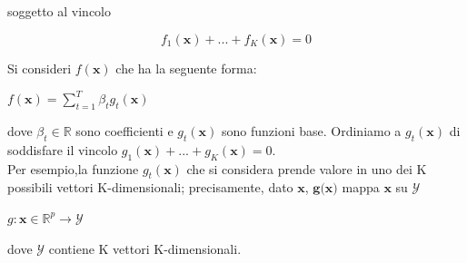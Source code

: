  soggetto al vincolo
\begin{center} 
\begin{equation}\label{eq:vincolo}
f_1(\textbf{x}) + ... + f_K(\textbf{x}) = 0
\end{equation}
\end{center}
Si consideri \begin{math}
              f(\textbf{x})
             \end{math} che ha la seguente forma:
\begin{center}
 \begin{math} f(\textbf{x}) = \sum_{t=1}^T\beta_t g_t(\textbf{x})
\end{math}
\end{center}
dove \begin{math}
      \beta_t \in \mathbb{R}
     \end{math} sono coefficienti e \begin{math}
                                    g_t(\textbf{x})
                                   \end{math} sono funzioni base. Ordiniamo a \begin{math}
                                    g_t(\textbf{x})
                                   \end{math} 
di soddisfare il vincolo \begin{math}g_1(\textbf{x}) + ... + g_K(\textbf{x}) = 0
\end{math}.\\
\newline 
Per esempio,la funzione \begin{math}
                                    g_t(\textbf{x})
                                   \end{math} che si considera prende valore in uno dei K possibili vettori 
K-dimensionali; precisamente, dato \begin{math}\textbf{x}\end{math}, 
\begin{math}\textbf{g(x)}\end{math} mappa \begin{math}\textbf{x}\end{math} su \begin{math}
                                                                               \mathcal{Y}
                                                                              \end{math}
\begin{center}
 \begin{math}
  g: \textbf{x} \in \mathbb{R}^p \rightarrow \mathcal{Y}
 \end{math}

\end{center}
dove \begin{math}
      \mathcal{Y}
     \end{math} contiene K vettori K-dimensionali.




